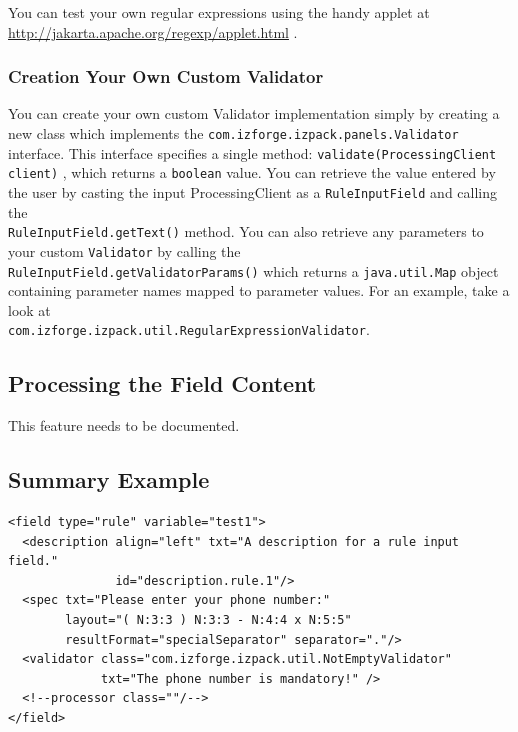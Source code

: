 You can test your own regular expressions using the handy applet at 
\url{http://jakarta.apache.org/regexp/applet.html} . \\

\subsubsection{Creation Your Own Custom Validator}

You can create your own custom Validator implementation simply by creating a 
new class which implements the \texttt{com.izforge.izpack.panels.Validator} 
interface.  This interface specifies a single method: 
\texttt{validate(ProcessingClient client)} , which returns a \texttt{boolean}
value.  You can retrieve the value entered by the user by casting the input
ProcessingClient as a \texttt{RuleInputField} and calling the \\
\texttt{RuleInputField.getText()} method.  You can also retrieve any  
parameters to your custom \texttt{Validator} by calling the \\
\texttt{RuleInputField.getValidatorParams()} which returns a \texttt{java.util.Map}
object containing parameter names mapped to parameter values.  For an example, take a
look at \\
\texttt{com.izforge.izpack.util.RegularExpressionValidator}.\\

\subsection{Processing the Field Content}

This feature needs to be documented.

\subsection{Summary Example}

\footnotesize
\begin{verbatim}
<field type="rule" variable="test1">
  <description align="left" txt="A description for a rule input field."
               id="description.rule.1"/>
  <spec txt="Please enter your phone number:" 
        layout="( N:3:3 ) N:3:3 - N:4:4 x N:5:5" 
        resultFormat="specialSeparator" separator="."/>
  <validator class="com.izforge.izpack.util.NotEmptyValidator"
             txt="The phone number is mandatory!" />
  <!--processor class=""/-->
</field>
\end{verbatim}
\normalsize

